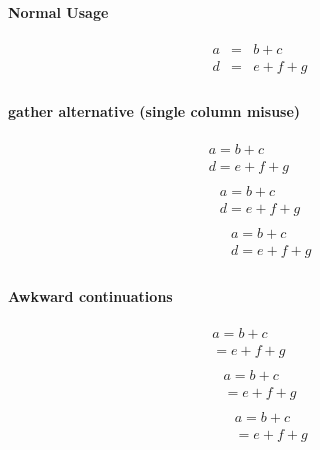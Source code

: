 \documentclass{article}
\begin{document}
\paragraph{Normal Usage}
\begin{eqnarray*}
a&=&b+c\\
d&=&e+f+g\\
\end{eqnarray*}
\paragraph{gather alternative (single column misuse)}
\begin{eqnarray*}
a=b+c&&\\
d=e+f+g&&\\
\end{eqnarray*}
\begin{eqnarray*}
&a=b+c&\\
&d=e+f+g&\\
\end{eqnarray*}
\begin{eqnarray*}
&&a=b+c\\
&&d=e+f+g\\
\end{eqnarray*}
\paragraph{Awkward continuations}
\begin{eqnarray*}
a=b+c&&\\
=e+f+g&&\\
\end{eqnarray*}
\begin{eqnarray*}
&a=b+c&\\
&=e+f+g&\\
\end{eqnarray*}
\begin{eqnarray*}
&&a=b+c\\
&&=e+f+g\\
\end{eqnarray*}
\end{document}
